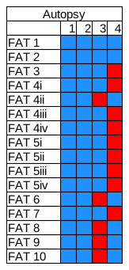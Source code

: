 \begin{figure}
    \centering

    \begin{subfigure}{0.16\linewidth}
        \includegraphics[width=\linewidth]{fig/autopsy_results_fat.png}

\end{subfigure}
\end{figure}
